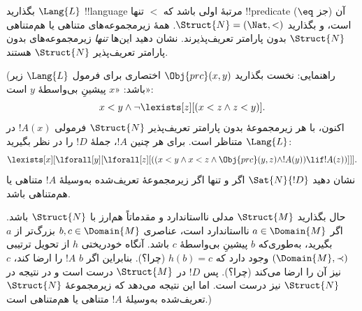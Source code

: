\documentclass[../../../include/open-logic-section]{subfiles}
\begin{document}
\begin{prob}
بگذارید $\Lang{L}$ !!{language} مرتبهٔ اولی باشد که $<$ تنها
!!{predicate} آن (جز $\eq$) است، و بگذارید
$\Struct{N}=(\Nat,<)$. همهٔ زیرمجموعه‌های متناهی یا هم‌متناهی
$\Struct{N}$ بدون پارامتر تعریف‌پذیرند. نشان دهید این‌ها \emph{تنها}
زیرمجموعه‌های بدون پارامتر تعریف‌پذیر $\Struct{N}$ هستند.

(راهنمایی: نخست بگذارید $\Obj{prc}(x,y)$ اختصاری برای فرمول
$\Lang{L}$ زیر باشد: «$x$ پیشینِ بی‌واسطهٔ $y$ است»:
\[
x<y \land \lnot \lexists[z][(x<z \land z<y)].
\]
اکنون، با هر زیرمجموعهٔ بدون پارامتر تعریف‌پذیر $\Struct{N}$ فرمولی
$!A(x)$ در $\Lang{L}$ متناظر است. برای هر چنین $!A$، جملهٔ $!D$ را
در نظر بگیرید:
\[
\lexists[x][\lforall[y][\lforall[z][((x<y \land x<z \land
  \Obj{prc}(y,z) \land !A(y)) \lif !A(z))]]].
\]
نشان دهید $\Sat{N}{!D}$ اگر و تنها اگر زیرمجموعهٔ تعریف‌شده به‌وسیلهٔ
$!A$ متناهی یا هم‌متناهی باشد.

حال بگذارید $\Struct{M}$ مدلی نااستاندارد و مقدماتاً هم‌ارز با
$\Struct{N}$ باشد. اگر $a\in\Domain{M}$ نااستاندارد است، عناصری
$b,c\in\Domain{M}$ بزرگ‌تر از $a$ بگیرید، به‌طوری‌که $b$ پیشینِ
بی‌واسطهٔ $c$ باشد. آنگاه خودریختی $h$ از تحویل ترتیبی
$(\Domain{M},\prec)$ وجود دارد که $h(b)=c$ (چرا؟). بنابراین اگر $b$
$!A$ را ارضا کند، $c$ نیز آن را ارضا می‌کند (چرا؟). پس $!D$ در
$\Struct{M}$ درست است و در نتیجه در $\Struct{N}$ نیز درست است. اما
این نتیجه می‌دهد که زیرمجموعهٔ $\Struct{N}$ تعریف‌شده به‌وسیلهٔ $!A$
متناهی یا هم‌متناهی است.)
\end{prob}
\end{document}
